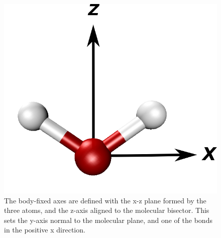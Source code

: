 \begin{figure}[h!]
	\begin{center}
		\includegraphics[scale=1.0]{images/molecularframesmall.png}
		\caption{The body-fixed axes are defined with the x-z plane formed by the three atoms, and the z-axis aligned to the molecular bisector. This sets the y-axis normal to the molecular plane, and one of the bonds in the positive x direction.}
		\label{fig:molecular-frame}
	\end{center}
\end{figure}

